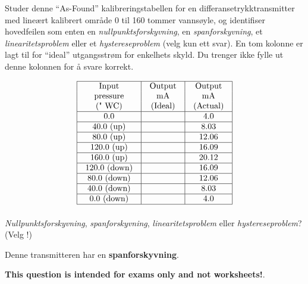 

Studer denne ``As-Found'' kalibreringstabellen for en differansetrykktransmitter med lineært kalibrert område 0 til 160 tommer vannsøyle, og identifiser hovedfeilen som enten en \textit{nullpunktsforskyvning}, en \textit{spanforskyvning}, et \textit{linearitetsproblem} eller et \textit{hystereseproblem} (velg kun ett svar).  En tom kolonne er lagt til for ``ideal'' utgangsstrøm for enkelhets skyld.  Du trenger ikke fylle ut denne kolonnen for å svare korrekt.


$$\vbox{\offinterlineskip
\halign{\strut
\vrule \quad\hfil # \ \hfil & 
\vrule \quad\hfil # \ \hfil & 
\vrule \quad\hfil # \ \hfil \vrule \cr
\noalign{\hrule}
%
Input & Output & Output \cr
%
pressure & mA & mA \cr
%
(" WC) & (Ideal) & (Actual) \cr
%
\noalign{\hrule}
%
0.0 & & 4.0 \cr
%
\noalign{\hrule}
%
40.0 (up) & & 8.03 \cr
%
\noalign{\hrule}
%
80.0 (up) & & 12.06 \cr
%
\noalign{\hrule}
%
120.0 (up) & & 16.09 \cr
%
\noalign{\hrule}
%
160.0 (up) & & 20.12 \cr
%
\noalign{\hrule}
%
120.0 (down) & & 16.09 \cr
%
\noalign{\hrule}
%
80.0 (down) & & 12.06 \cr
%
\noalign{\hrule}
%
40.0 (down) & & 8.03 \cr
%
\noalign{\hrule}
%
0.0 (down) & & 4.0 \cr
%
\noalign{\hrule}
} %
}$$ %

\textit{Nullpunktsforskyvning}, \textit{spanforskyvning}, \textit{linearitetsproblem} eller \textit{hystereseproblem}?  (Velg !)







Denne transmitteren har en {\bf spanforskyvning}.







{\bf This question is intended for exams only and not worksheets!}.

